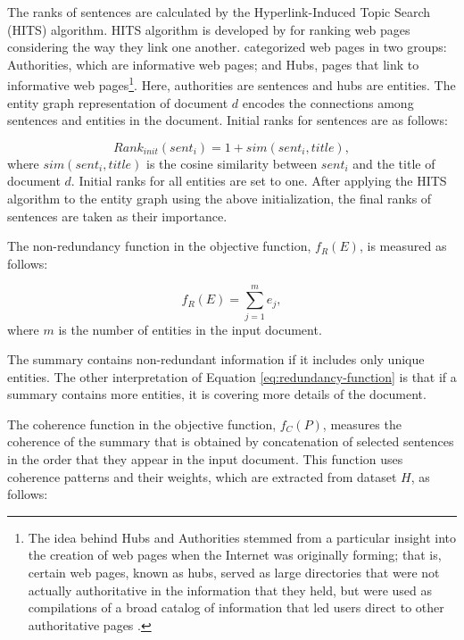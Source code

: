The ranks of sentences are calculated  by the \mbox{Hyperlink-Induced} Topic Search (HITS) algorithm.
HITS algorithm is developed by  for ranking web pages considering the way they link one another. 
 categorized web pages in two groups:  Authorities, which are informative web pages; and Hubs, pages that link to informative web pages\footnote{The idea behind Hubs and Authorities stemmed from a particular insight into the creation of web pages when the Internet was originally forming; that is, certain web pages, known as hubs, served as large directories that were not actually authoritative in the information that they held, but were used as compilations of a broad catalog of information that led users direct to other authoritative pages \cite{}.}.
Here, authorities are sentences and hubs are entities.  
The entity graph representation of document $d$ encodes the connections among sentences and entities in the document. 
Initial ranks for sentences are as follows:

\begin{equation}
Rank_{init}(sent_i)= 1 + sim (sent_i, title),
\end{equation}
where $sim(sent_i, title)$ is the cosine similarity between $sent_i$ and the title of document $d$. 
Initial ranks for all entities are set to one. 
After applying the HITS algorithm to the entity graph using the above initialization, the final ranks of sentences are taken as their importance. 

The non-redundancy function in the objective function, $f_R(E)$,    
is measured as follows:

\begin{equation}
\label{eq:redundancy-function}
f_R(E) = \sum_{j=1}^{m}{e_j},
\end{equation}
where $m$ is the number of entities in the input document. 

The summary contains non-redundant information if it includes only unique entities. 
The other interpretation of Equation \ref{eq:redundancy-function} is that if a summary contains more entities, it is covering more details of the document. 

The coherence function in the objective function, $f_C(P)$, measures the coherence of the summary that is obtained by concatenation of selected sentences in the order that they appear in the input document. 
This function uses coherence patterns and their weights, which are extracted from dataset $H$, as follows:

